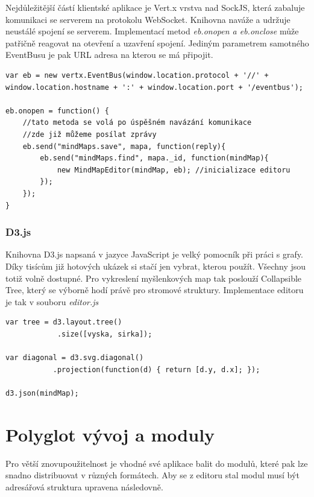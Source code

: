 Nejdůležitější částí klientské aplikace je Vert.x vrstva nad SockJS\cite{sockjs}, která zabaluje komunikaci se serverem na protokolu WebSocket\cite{webSockets}. Knihovna naváže a udržuje neustálé spojení se serverem. Implementací metod \emph{eb.onopen a eb.onclose} může patřičně reagovat na otevření a uzavření spojení. Jediným parametrem samotného EventBusu je pak URL adresa na kterou se má připojit.

\begin{lstlisting}[caption=Připojení Event busu z prohlížeče a inicializace editoru]
var eb = new vertx.EventBus(window.location.protocol + '//' + window.location.hostname + ':' + window.location.port + '/eventbus');

eb.onopen = function() {
	//tato metoda se volá po úspěšném navázání komunikace
	//zde již můžeme posílat zprávy
	eb.send("mindMaps.save", mapa, function(reply){
		eb.send("mindMaps.find", mapa._id, function(mindMap){
			new MindMapEditor(mindMap, eb); //inicializace editoru
		});	
	});
}
\end{lstlisting}

\subsubsection{D3.js}

Knihovna D3.js napsaná v jazyce JavaScript je velký pomocník při práci s grafy. Díky tisícům již hotových ukázek si stačí jen vybrat, kterou použít. Všechny jsou totiž volně dostupné. Pro vykreslení myšlenkových map tak poslouží Collapsible Tree\cite{d3js}, který se výborně hodí právě pro stromové struktury. Implementace editoru je tak v souboru \emph{editor.js}

\begin{lstlisting}[caption=D3.js nicializace dat]
var tree = d3.layout.tree()
		    .size([vyska, sirka]);

var diagonal = d3.svg.diagonal()
		   .projection(function(d) { return [d.y, d.x]; });
		   
d3.json(mindMap);
\end{lstlisting}


\section{Polyglot vývoj a moduly}\label{sec:praktickyModuly}

Pro větší znovupoužitelnost je vhodné své aplikace balit do modulů, které pak lze snadno distribuovat v různých formátech. Aby se z editoru stal modul musí být adresářová struktura upravena následovně.

